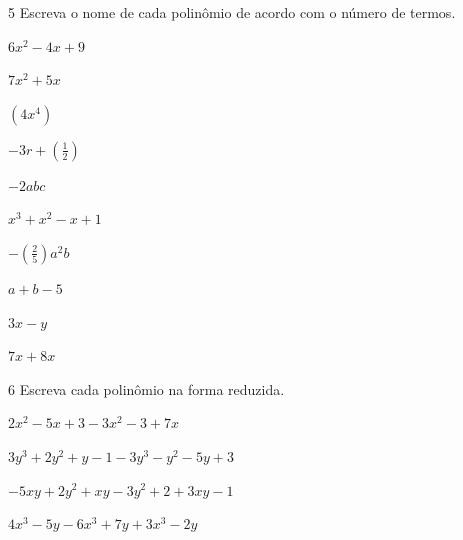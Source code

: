 \num{5} Escreva o nome de cada polinômio de acordo com o número de termos.

\begin{escolha}[itemsep=0pt]
\item $6x^2 - 4x +9$  
        
\item $7x^2 + 5 x$  
        
\item $(4x^4)$  
        
\item $-3r + (\frac{1}{2})$  
  
\item $-2abc$  
        
\item $x^3 + x^2 - x + 1$  
        
\item $-(\frac{2}{5}) a^2b$  
        
\item $a + b - 5$  
        
\item $3x - y$  
        
\item $7x + 8x$  
        
\end{escolha}


\num{6} Escreva cada polinômio na forma reduzida.

\begin{escolha}[itemsep=0pt]
\item $2x^2 - 5x + 3 - 3x^2 - 3 + 7x$
        
\item $3y^3 + 2y^2 + y - 1 - 3y^3 - y^2 - 5y +3$
        
\item $-5xy + 2y^2 + xy - 3y^2 + 2 + 3xy - 1$
        
\item $4x^3 - 5y - 6x^3 + 7y + 3x^3 - 2y$
        
\end{escolha}


